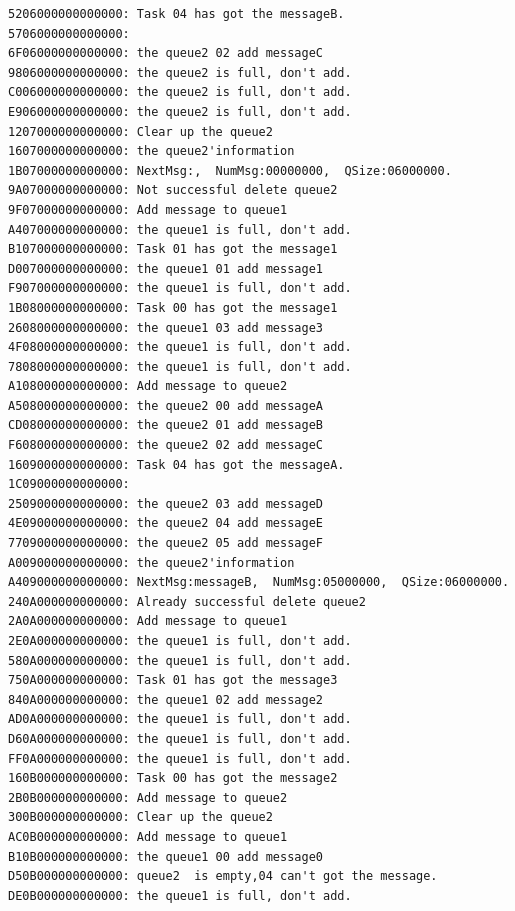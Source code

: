 \documentclass{ctexart}
\begin{document}
\begin{lstlisting}[language={}]
5206000000000000: Task 04 has got the messageB.
5706000000000000:
6F06000000000000: the queue2 02 add messageC
9806000000000000: the queue2 is full, don't add.
C006000000000000: the queue2 is full, don't add.
E906000000000000: the queue2 is full, don't add.
1207000000000000: Clear up the queue2
1607000000000000: the queue2'information
1B07000000000000: NextMsg:,  NumMsg:00000000,  QSize:06000000.
9A07000000000000: Not successful delete queue2
9F07000000000000: Add message to queue1
A407000000000000: the queue1 is full, don't add.
B107000000000000: Task 01 has got the message1
D007000000000000: the queue1 01 add message1
F907000000000000: the queue1 is full, don't add.
1B08000000000000: Task 00 has got the message1
2608000000000000: the queue1 03 add message3
4F08000000000000: the queue1 is full, don't add.
7808000000000000: the queue1 is full, don't add.
A108000000000000: Add message to queue2
A508000000000000: the queue2 00 add messageA
CD08000000000000: the queue2 01 add messageB
F608000000000000: the queue2 02 add messageC
1609000000000000: Task 04 has got the messageA.
1C09000000000000:
2509000000000000: the queue2 03 add messageD
4E09000000000000: the queue2 04 add messageE
7709000000000000: the queue2 05 add messageF
A009000000000000: the queue2'information
A409000000000000: NextMsg:messageB,  NumMsg:05000000,  QSize:06000000.
240A000000000000: Already successful delete queue2
2A0A000000000000: Add message to queue1
2E0A000000000000: the queue1 is full, don't add.
580A000000000000: the queue1 is full, don't add.
750A000000000000: Task 01 has got the message3
840A000000000000: the queue1 02 add message2
AD0A000000000000: the queue1 is full, don't add.
D60A000000000000: the queue1 is full, don't add.
FF0A000000000000: the queue1 is full, don't add.
160B000000000000: Task 00 has got the message2
2B0B000000000000: Add message to queue2
300B000000000000: Clear up the queue2
AC0B000000000000: Add message to queue1
B10B000000000000: the queue1 00 add message0
D50B000000000000: queue2  is empty,04 can't got the message.
DE0B000000000000: the queue1 is full, don't add.
    \end{lstlisting}
\end{document}
